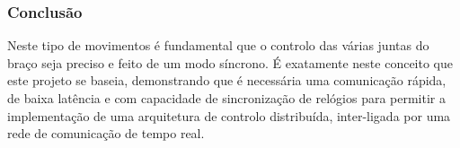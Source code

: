 \subsubsection{Conclusão}
Neste tipo de movimentos é fundamental que o controlo das várias juntas
do braço seja preciso e feito de um modo síncrono. É exatamente neste
conceito que este projeto se baseia, demonstrando que é necessária uma
comunicação rápida, de baixa latência e com capacidade de sincronização
de relógios para permitir a implementação de uma arquitetura de controlo
distribuída, inter-ligada por uma rede de comunicação de tempo real.
